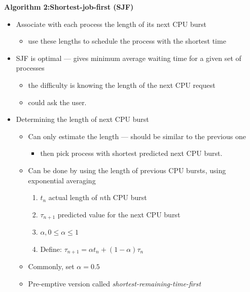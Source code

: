 \documentclass[11pt,a4paper]{article}
\begin{document}
\textbf{Algorithm 2:\@ Shortest-job-first (SJF)}
\begin{itemize}
    \item Associate with each process the length of its next CPU burst
        \begin{itemize}
            \item use these lengths to schedule the process with the shortest time
        \end{itemize}
    \item SJF is optimal --- gives minimum average waiting time for a given set of processes
        \begin{itemize}
            \item the difficulty is knowing the length of the next CPU request
            \item could ask the user.
        \end{itemize}
    \item Determining the length of next CPU burst
        \begin{itemize}
            \item Can only estimate the length --- should be similar to the previous one
                \begin{itemize}
                    \item then pick process with shortest predicted next CPU burst.
                \end{itemize}
            \item Can be done by  using the length of previous CPU bursts, using exponential
                averaging
                \begin{enumerate}
                    \item $t_n$ actual length of $n$th CPU burst
                    \item $\tau_{n+1}$ predicted value for the next CPU burst
                    \item $\alpha, 0 \leq \alpha \leq 1$
                    \item Define: $\tau_{n+1} = \alpha t_n + (1-\alpha)\tau_n$
                \end{enumerate}
            \item Commonly, set $\alpha = 0.5$
            \item Pre-emptive version called \emph{shortest-remaining-time-first}
        \end{itemize}
\end{itemize}
\end{document}
